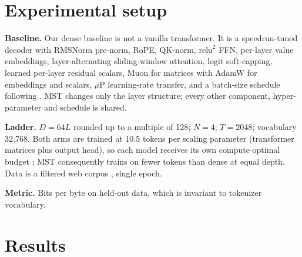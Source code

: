 \documentclass{article}
\newcommand{\dmodel}{D}
\newcommand{\nsub}{N}
\begin{document}
\section{Experimental setup}
\label{sec:experiments}

\textbf{Baseline.} Our dense baseline is not a vanilla transformer. It is a
speedrun-tuned decoder \citep{karpathy2025nanochat} with RMSNorm pre-norm, RoPE,
QK-norm, $\mathrm{relu}^2$ FFN, per-layer value embeddings, layer-alternating
sliding-window attention, logit soft-capping, learned per-layer residual scalars,
Muon for matrices with AdamW for embeddings and scalars, $\mu$P learning-rate
transfer, and a batch-size schedule following \citet{bergsma2025powerlines}. MST
changes only the layer structure; every other component, hyper-parameter and
schedule is shared.

\textbf{Ladder.} $\dmodel = 64L$ rounded up to a multiple of 128; $\nsub{=}4$;
$T{=}2048$; vocabulary 32{,}768. Both arms are trained at 10.5 tokens per scaling
parameter (transformer matrices plus output head), so each model receives its own
compute-optimal budget \citep{hoffmann2022chinchilla}; MST consequently trains on
fewer tokens than dense at equal depth. Data is a filtered web corpus
\citep{penedo2024fineweb}, single epoch.

\textbf{Metric.} Bits per byte on held-out data, which is invariant to tokenizer
vocabulary.

\section{Results}
\label{sec:results}
\end{document}
